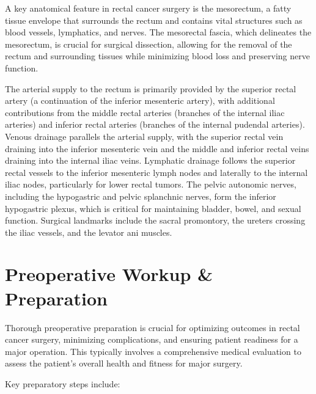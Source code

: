 A key anatomical feature in rectal cancer surgery is the mesorectum, a fatty tissue envelope that surrounds the rectum and contains vital structures such as blood vessels, lymphatics, and nerves. The mesorectal fascia, which delineates the mesorectum, is crucial for surgical dissection, allowing for the removal of the rectum and surrounding tissues while minimizing blood loss and preserving nerve function.

The arterial supply to the rectum is primarily provided by the superior rectal artery (a continuation of the inferior mesenteric artery), with additional contributions from the middle rectal arteries (branches of the internal iliac arteries) and inferior rectal arteries (branches of the internal pudendal arteries). Venous drainage parallels the arterial supply, with the superior rectal vein draining into the inferior mesenteric vein and the middle and inferior rectal veins draining into the internal iliac veins. Lymphatic drainage follows the superior rectal vessels to the inferior mesenteric lymph nodes and laterally to the internal iliac nodes, particularly for lower rectal tumors. The pelvic autonomic nerves, including the hypogastric and pelvic splanchnic nerves, form the inferior hypogastric plexus, which is critical for maintaining bladder, bowel, and sexual function. Surgical landmarks include the sacral promontory, the ureters crossing the iliac vessels, and the levator ani muscles.

\section*{Preoperative Workup \& Preparation}
Thorough preoperative preparation is crucial for optimizing outcomes in rectal cancer surgery, minimizing complications, and ensuring patient readiness for a major operation. This typically involves a comprehensive medical evaluation to assess the patient's overall health and fitness for major surgery.

Key preparatory steps include:

